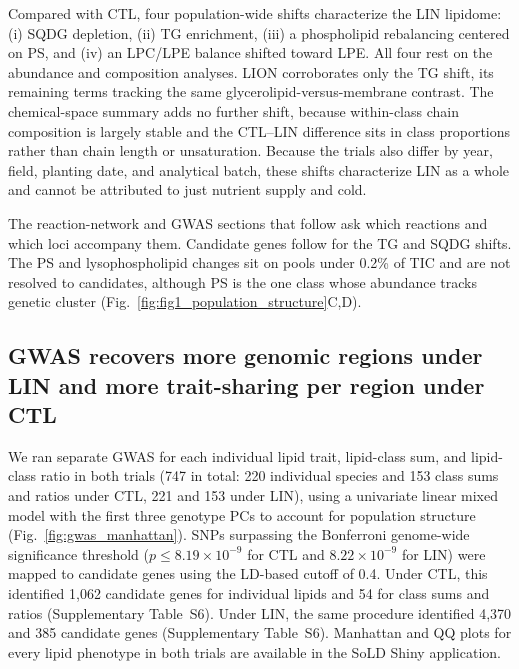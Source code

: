 \documentclass[9pt,twocolumn,twoside]{rilabRxiv}
\begin{document}
Compared with CTL, four population-wide shifts characterize the LIN lipidome: (i) SQDG depletion, (ii) TG enrichment, (iii) a phospholipid rebalancing centered on PS, and (iv) an LPC/LPE balance shifted toward LPE. All four rest on the abundance and composition analyses. LION corroborates only the TG shift, its remaining terms tracking the same glycerolipid-versus-membrane contrast. The chemical-space summary adds no further shift, because within-class chain composition is largely stable and the CTL--LIN difference sits in class proportions rather than chain length or unsaturation. Because the trials also differ by year, field, planting date, and analytical batch, these shifts characterize LIN as a whole and cannot be attributed to just nutrient supply and cold. 

The reaction-network and GWAS sections that follow ask which reactions and which loci accompany them. Candidate genes follow for the TG and SQDG shifts. The PS and lysophospholipid changes sit on pools under 0.2\% of TIC and are not resolved to candidates, although PS is the one class whose abundance tracks genetic cluster (Fig.~\ref{fig:fig1_population_structure}C,D).


\subsection*{GWAS recovers more genomic regions under LIN and more trait-sharing per region under CTL}

We ran separate GWAS for each individual lipid trait, lipid-class sum, and lipid-class ratio in both trials (747 in total: 220 individual species and 153 class sums and ratios under CTL, 221 and 153 under LIN), using a univariate linear mixed model with the first three genotype PCs to account for population structure (Fig.~\ref{fig:gwas_manhattan}). SNPs surpassing the Bonferroni genome-wide significance threshold ($p \leq 8.19 \times 10^{-9}$ for CTL and $8.22 \times 10^{-9}$ for LIN) were mapped to candidate genes using the LD-based cutoff of 0.4. Under CTL, this identified 1,062 candidate genes for individual lipids and 54 for class sums and ratios (Supplementary Table~S6). Under LIN, the same procedure identified 4,370 and 385 candidate genes (Supplementary Table~S6). Manhattan and QQ plots for every lipid phenotype in both trials are available in the SoLD Shiny application.
\end{document}
